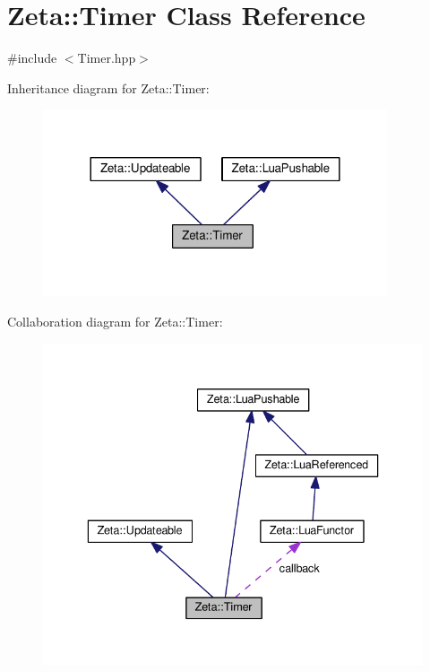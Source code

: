 \hypertarget{classZeta_1_1Timer}{\section{Zeta\+:\+:Timer Class Reference}
\label{classZeta_1_1Timer}
}


{\ttfamily \#include $<$Timer.\+hpp$>$}



Inheritance diagram for Zeta\+:\+:Timer\+:\nopagebreak
\begin{figure}[H]
\begin{center}
\leavevmode
\includegraphics[width=288pt]{classZeta_1_1Timer__inherit__graph}
\end{center}
\end{figure}


Collaboration diagram for Zeta\+:\+:Timer\+:\nopagebreak
\begin{figure}[H]
\begin{center}
\leavevmode
\includegraphics[width=336pt]{classZeta_1_1Timer__coll__graph}
\end{center}
\end{figure}
